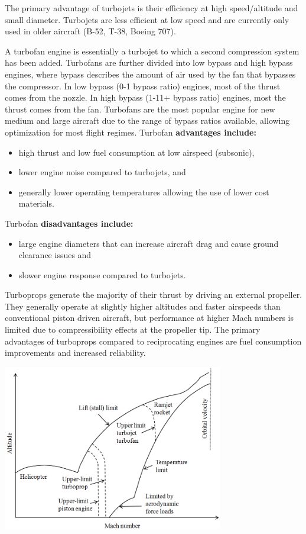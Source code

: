 \documentclass[
]{book}
\providecommand{\tightlist}{%
  \setlength{\itemsep}{0pt}\setlength{\parskip}{0pt}}
\begin{document}
The primary advantage of turbojets is their efficiency at high speed/altitude
and small diameter. Turbojets are less efficient at low speed and are currently
only used in older aircraft (B-52, T-38, Boeing 707).

A turbofan engine is essentially a turbojet to which a second compression system
has been added. Turbofans are further divided into low bypass and high bypass
engines, where bypass describes the amount of air used by the fan that bypasses
the compressor. In low bypass (0-1 bypass ratio) engines, most of the thrust
comes from the nozzle. In high bypass (1-11+ bypass ratio) engines, most the
thrust comes from the fan. Turbofans are the most popular engine for new medium
and large aircraft due to the range of bypass ratios available, allowing
optimization for most flight regimes. Turbofan \textbf{advantages include:}

\begin{itemize}
\tightlist
\item
  high thrust and low fuel consumption at low airspeed (subsonic),
\item
  lower engine noise compared to turbojets, and
\item
  generally lower operating temperatures allowing the use of lower cost materials.
\end{itemize}

Turbofan \textbf{disadvantages include:}

\begin{itemize}
\tightlist
\item
  large engine diameters that can increase aircraft drag and cause ground clearance issues and
\item
  slower engine response compared to turbojets.
\end{itemize}

Turboprops generate the majority of their thrust by driving an external
propeller. They generally operate at slightly higher altitudes and faster
airspeeds than conventional piston driven aircraft, but performance at higher
Mach numbers is limited due to compressibility effects at the propeller tip. The
primary advantages of turboprops compared to reciprocating engines are fuel
consumption improvements and increased reliability.

\includegraphics[width=3.79881in,height=2.85099in]{media/17/image5.png}
\end{document}
